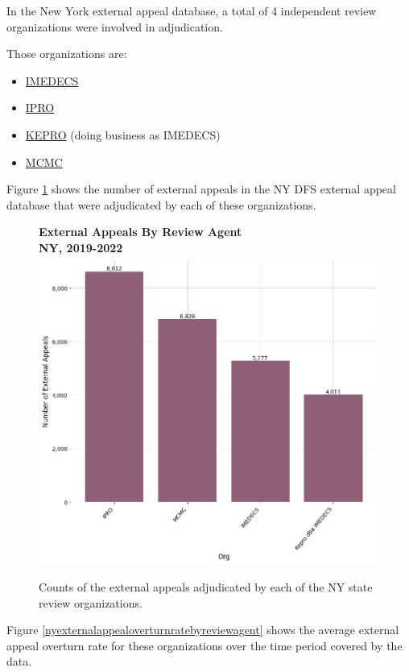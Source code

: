 \documentclass[12pt, a4paper,twoside,parskip=full]{report}
\theoremstyle{plain} %
\theoremstyle{definition} %
\theoremstyle{remark} %
\numberwithin{equation}{chapter}
\begin{document}
		In the New York external appeal database, a total of 4 independent review organizations were involved in adjudication.
		
		Those organizations are:
		
		\begin{itemize}
			\item \href{https://www.imedecs.com/}{IMEDECS}
			\item \href{https://ipro.org/}{IPRO}
			\item \href{https://www.kepro.com/}{KEPRO} (doing business as IMEDECS)
			\item \href{https://www.mcmcllc.com/}{MCMC}
		\end{itemize}
	
		Figure \ref{nyexternalappealsbyreviewagent} shows the number of external appeals in the NY DFS external appeal database that were adjudicated by each of these organizations.
		
		\begin{figure}[h!]
			\centering
			\textbf{External Appeals By Review Agent}\\
			\textbf{NY, 2019-2022}\\
			\includegraphics[width=.8\textwidth]{images/nys_external/external_appeals_by_agent.png}
			\caption{Counts of the external appeals adjudicated by each of the NY state review organizations.}
			\label{nyexternalappealsbyreviewagent}
		\end{figure}
		\clearpage
	
		Figure \ref{nyexternalappealoverturnratebyreviewagent} shows the average external appeal overturn rate for these organizations over the time period covered by the data.
		
\end{document}

